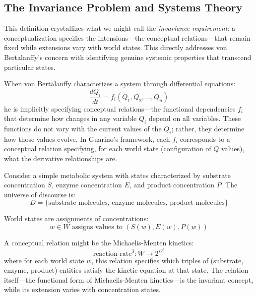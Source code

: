 \subsection{The Invariance Problem and Systems Theory}

This definition crystallizes what we might call the \emph{invariance requirement}: a conceptualization specifies the intensions—the conceptual relations—that remain fixed while extensions vary with world states. This directly addresses von Bertalanffy's concern with identifying genuine systemic properties that transcend particular states.

When von Bertalanffy characterizes a system through differential equations:
$$\frac{dQ_i}{dt} = f_i(Q_1, Q_2, \ldots, Q_n)$$
he is implicitly specifying conceptual relations—the functional dependencies $f_i$ that determine how changes in any variable $Q_i$ depend on all variables. These functions do not vary with the current values of the $Q_i$; rather, they determine how those values evolve. In Guarino's framework, each $f_i$ corresponds to a conceptual relation specifying, for each world state (configuration of $Q$ values), what the derivative relationships are.

\begin{example}
	Consider a simple metabolic system with states characterized by substrate concentration $S$, enzyme concentration $E$, and product concentration $P$. The universe of discourse is:
	$$D = \{\text{substrate molecules, enzyme molecules, product molecules}\}$$
	
	World states are assignments of concentrations:
	$$w \in W \text{ assigns values to } (S(w), E(w), P(w))$$
	
	A conceptual relation might be the Michaelis-Menten kinetics:
	$$\text{reaction-rate}^3 : W \to 2^{D^3}$$
	where for each world state $w$, this relation specifies which triples of (substrate, enzyme, product) entities satisfy the kinetic equation at that state. The relation itself—the functional form of Michaelis-Menten kinetics—is the invariant concept, while its extension varies with concentration states.
\end{example}